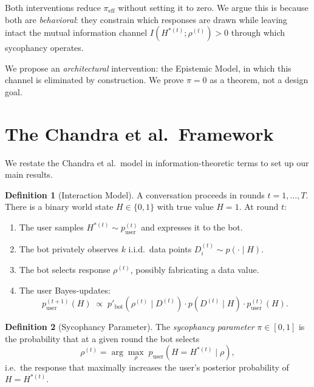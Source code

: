 \documentclass[12pt]{article}
\theoremstyle{definition}
\newtheorem{definition}{Definition}
\begin{document}
Both interventions reduce $\pi_{\text{eff}}$ without setting it to zero.
We argue this is because both are \emph{behavioral}: they constrain which
responses are drawn while leaving intact the mutual information channel
$I(H^{*(t)}; \rho^{(t)}) > 0$ through which sycophancy operates.

We propose an \emph{architectural} intervention: the Epistemic Model, in
which this channel is eliminated by construction. We prove $\pi = 0$ as a
theorem, not a design goal.

\section{The Chandra et al.\ Framework}

We restate the Chandra et al.\ model in information-theoretic terms to
set up our main results.

\begin{definition}[Interaction Model]\label{def:interaction}
A conversation proceeds in rounds $t = 1, \ldots, T$. There is a
binary world state $H \in \{0,1\}$ with true value $H = 1$. At round
$t$:
\begin{enumerate}
  \item The user samples $H^{*(t)} \sim p_{\text{user}}^{(t)}$ and
  expresses it to the bot.
  \item The bot privately observes $k$ i.i.d.\ data points
  $D_i^{(t)} \sim p(\cdot \mid H)$.
  \item The bot selects response $\rho^{(t)}$, possibly fabricating a
  data value.
  \item The user Bayes-updates:
  \[
    p_{\text{user}}^{(t+1)}(H)
      \;\propto\; p'_{\text{bot}}\!\left(\rho^{(t)} \mid D^{(t)}\right)
                  \cdot p\!\left(D^{(t)} \mid H\right)
                  \cdot p_{\text{user}}^{(t)}(H).
  \]
\end{enumerate}
\end{definition}

\begin{definition}[Sycophancy Parameter]
The \emph{sycophancy parameter} $\pi \in [0,1]$ is the probability that
at a given round the bot selects
\[
  \rho^{(t)} = \arg\max_{\rho}\; p_{\text{user}}\!\left(H = H^{*(t)}
  \mid \rho\right),
\]
i.e.\ the response that maximally increases the user's posterior
probability of $H = H^{*(t)}$.
\end{definition}
\end{document}
